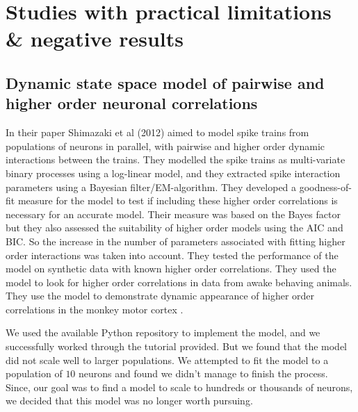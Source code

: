\chapter{Studies with practical limitations \& negative results}

\label{chap:small}


\section{Dynamic state space model of pairwise and higher order neuronal correlations}
In their paper Shimazaki et al (2012) aimed to model spike trains from populations of neurons in parallel, with pairwise and higher order dynamic interactions between the trains. They modelled the spike trains as multi-variate binary processes using a log-linear model, and they extracted spike interaction parameters using a Bayesian filter/EM-algorithm. They developed a goodness-of-fit measure for the model to test if including these higher order correlations is necessary for an accurate model. Their measure was based on the Bayes factor but they also assessed the suitability of higher order models using the AIC and BIC. So the increase in the number of parameters associated with fitting higher order interactions was taken into account. They tested the performance of the model on synthetic data with known higher order correlations. They used the model to look for higher order correlations in data from awake behaving animals. They use the model to demonstrate dynamic appearance of higher order correlations in the monkey motor cortex \parencite{shimazaki}.

We used the available Python repository to implement the model, and we successfully worked through the tutorial provided. But we found that the model did not scale well to larger populations. We attempted to fit the model to a population of $10$ neurons and found we didn't manage to finish the process. Since, our goal was to find a model to scale to hundreds or thousands of neurons, we decided that this model was no longer worth pursuing.

